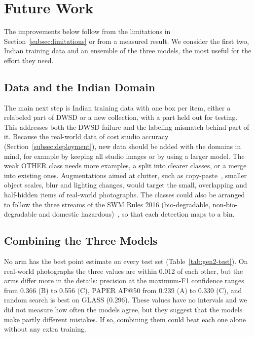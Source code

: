 \section{Future Work}
\label{sec:future}

The improvements below follow from the limitations in Section~\ref{subsec:limitations} or from a measured result. We consider the first two, Indian training data and an ensemble of the three models, the most useful for the effort they need.

\subsection{Data and the Indian Domain}
\label{subsec:fw-data}

The main next step is Indian training data with one box per item, either a relabeled part of DWSD or a new collection, with a part held out for testing. This addresses both the DWSD failure and the labeling mismatch behind part of it. Because the real-world data of \gentwo cost studio accuracy (Section~\ref{subsec:deployment}), new data should be added with the domains in mind, for example by keeping all studio images or by using a larger model. The weak OTHER class needs more examples, a split into clearer classes, or a merge into existing ones. Augmentations aimed at clutter, such as copy-paste~\cite{ghiasi2021simple}, smaller object scales, blur and lighting changes, would target the small, overlapping and half-hidden items of real-world photographs. The classes could also be arranged to follow the three streams of the SWM Rules 2016 (bio-degradable, non-bio-degradable and domestic hazardous)~\cite{moefcc2016solid}, so that each detection maps to a bin.

\subsection{Combining the Three Models}
\label{subsec:fw-ensemble}

No arm has the best point estimate on every \gentwo test set (Table~\ref{tab:gen2-test}). On real-world photographs the three \mapfifty values are within 0.012 of each other, but the arms differ more in the details: precision at the maximum-F1 confidence ranges from 0.366 (B) to 0.556 (C), PAPER AP@50 from 0.239 (A) to 0.330 (C), and random search is best on GLASS (0.296). These values have no intervals and we did not measure how often the models agree, but they suggest that the models make partly different mistakes. If so, combining them could beat each one alone without any extra training.

